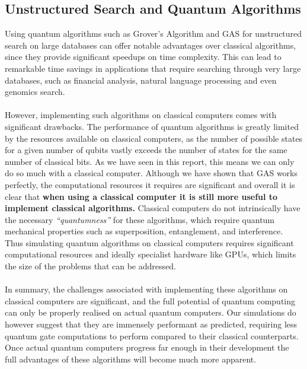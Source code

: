 \documentclass{article}[11pt]
\begin{document}
\subsection{Unstructured Search and Quantum Algorithms}
Using quantum algorithms such as Grover's Algorithm and GAS for unstructured search on large databases can offer notable advantages over classical algorithms, since they provide significant speedups on time complexity.\cite{grover,baritompa} This can lead to remarkable time savings in applications that require searching through very large databases, such as financial analysis, natural language processing and even genomics search.\\
\\
However, implementing such  algorithms on classical computers comes with significant drawbacks. The performance of quantum algorithms is greatly limited by the resources available on classical computers, as the number of possible states for a given number of qubits vastly exceeds the number of states for the same number of classical bits. As we have seen in this report, this means we can only do so much with a classical computer. Although we have shown that GAS works perfectly, the computational resources it requires are significant and overall it is clear that \textbf{when using a classical computer it is still more useful to implement classical algorithms.} Classical computers do not intrinsically have the necessary \textit{``quantumness''} for these algorithms, which require quantum mechanical properties such as superposition, entanglement, and interference.\cite{nielsenChuang} Thus simulating quantum algorithms on classical computers requires significant computational resources and ideally specialist hardware like GPUs, which limits the size of the problems that can be addressed.\\
\\
In summary, the challenges associated with implementing these algorithms on classical computers are significant, and the full potential of quantum computing can only be properly realised on actual quantum computers. Our simulations do however suggest that they are immensely performant as predicted, requiring less quantum gate computations to perform compared to their classical counterparts. Once actual quantum computers progress far enough in their development the full advantages of these algorithms will become much more apparent.
\end{document}
